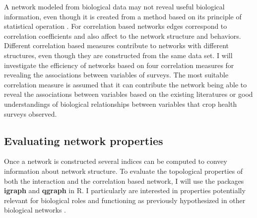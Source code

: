 A network modeled from biological data may not reveal useful biological information, even though it is created from a method based on its principle of statistical operation . For correlation based networks edges correspond to correlation coefficients and also affect to the network structure and behaviors. Different correlation based measures contribute to networks with different structures, even though they are constructed from the same data set. I will investigate the efficiency of networks based on four correlation measures for revealing the associations between variables of surveys. The most suitable correlation measure is assumed that it can contribute the network being able to reveal the associations between variables based on the existing literatures or good understandings of biological relationships between variables that crop health surveys observed.


\subsection*{Evaluating network properties}
Once a network is constructed several indices can be computed to convey information about network structure. To evaluate the topological properties of both the interaction and the correlation based network, I will use the packages \textbf{igraph}  and \textbf{qgraph}  in R. I particularly are interested in properties potentially relevant for biological roles and functioning as previously hypothesized in other biological networks .

